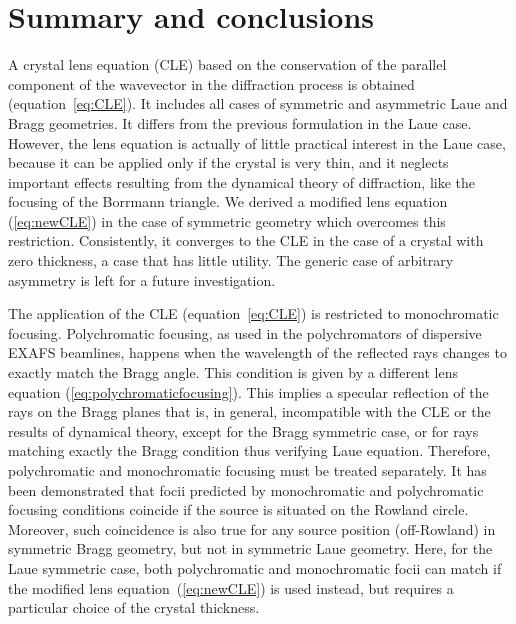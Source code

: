 \documentclass[preprint]{iucr}              %
\begin{document}
\section{Summary and conclusions}
\label{sec:summary}
A crystal lens equation (CLE) based on the conservation of the parallel component of the wavevector in the diffraction process is obtained (equation~\ref{eq:CLE}). It includes all cases of symmetric and asymmetric Laue and Bragg geometries. It differs from the previous formulation \cite{CK} in the Laue case. However, the lens equation is actually of little practical interest in the Laue case, because it can be applied only if the crystal is very thin, and it neglects important effects resulting from the dynamical theory of diffraction, like the focusing of the Borrmann triangle. We derived a modified lens equation (\ref{eq:newCLE}) in the case of symmetric geometry which overcomes this restriction. Consistently, it converges to the CLE in the case of a crystal with zero thickness, a case that has little utility. The generic case of arbitrary asymmetry is left for a future investigation.

The application of the CLE (equation~\ref{eq:CLE}) is restricted to monochromatic focusing. Polychromatic focusing, as used in the polychromators of dispersive EXAFS beamlines, happens when the wavelength of the reflected rays changes to exactly match the Bragg angle. This condition is given by a different lens equation (\ref{eq:polychromaticfocusing}). This implies a specular reflection of the rays on the Bragg planes that is, in general, incompatible with the CLE or the results of dynamical theory, except for the Bragg symmetric case, or for rays matching exactly the Bragg condition thus verifying Laue equation. Therefore, polychromatic and monochromatic focusing must be treated separately. It has been demonstrated that focii predicted by monochromatic and polychromatic focusing conditions coincide if the source is situated on the Rowland circle. Moreover, such coincidence is also true for any source position (off-Rowland) in symmetric Bragg geometry, but not in symmetric Laue geometry. Here, for the Laue symmetric case, both polychromatic and monochromatic focii can match if the modified lens equation~(\ref{eq:newCLE}) is used instead, but requires a particular choice of the crystal thickness.

\end{document}
